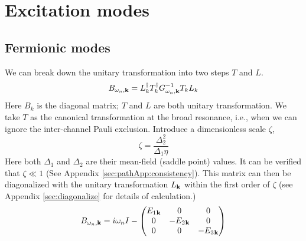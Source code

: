 \documentclass[reprint,pra]{revtex4-1}
\begin{document}
  
  
  
  
\section{Excitation modes\label{sec:excitation}}
\subsection{Fermionic modes}
We  can break down the unitary transformation into two steps $T$ and $L$. 
\begin{equation}\label{eq:pathInt2:B}
B_{\omega_{n},\mathbf{k}}=L_k^{\dagger}T_k^{\dagger}G_{\omega_{n},\mathbf{k}}^{-1}T_kL_k
\end{equation} 
Here $B_{k}$ is the diagonal matrix; $T$ and $L$ are both unitary transformation.  We take $T$ as the canonical transformation at the broad resonance, i.e., when we can ignore the inter-channel Pauli exclusion. 
Introduce a dimensionless scale $\zeta$,
\begin{equation}\label{eq:pathInt2:zetaDef}
\boxed{\zeta=\frac{\Delta_{2}^{2}}{\Delta_{1}\eta}}
\end{equation}
Here both $\Delta_{1}$ and $\Delta_{2}$ are their mean-field (saddle point) values.  It can be verified that $\zeta\ll1$ (See Appendix \ref{sec:pathApp:consistency}).  
This matrix can then be diagonalized with  the unitary transformation $L_{\mathbf{k}}$ within the first order of $\zeta$  (see Appendix \ref{sec:diagonalize} for details of calculation.)
\begin{equation}\label{eq:pathInt2:Bapprox}
\begin{split}
B_{\omega_{n},\mathbf{k}}&=i\omega_{n}I-
	\begin{pmatrix}E_{1}{}_{\mathbf{k}}&0&0\\0&-E_{2}{}_{\mathbf{k}}&0\\0&0&-E_{3}{}_{\mathbf{k}}\end{pmatrix}\\
\end{split}	
\end{equation}
\end{document}
